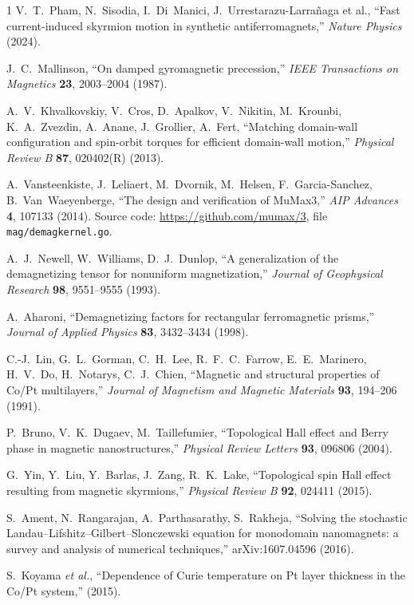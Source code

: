\documentclass[11pt,a4paper]{article}
\begin{document}
\begin{thebibliography}{1}
V.~T.~Pham, N.~Sisodia, I.~Di~Manici,
J.~Urrestarazu-Larra\~{n}aga et al.,
``Fast current-induced skyrmion motion in synthetic
antiferromagnets,''
\emph{Nature Physics} (2024).

J.~C.~Mallinson,
``On damped gyromagnetic precession,''
\emph{IEEE Transactions on Magnetics}
\textbf{23}, 2003--2004 (1987).

A.~V.~Khvalkovskiy, V.~Cros, D.~Apalkov, V.~Nikitin,
M.~Krounbi, K.~A.~Zvezdin, A.~Anane, J.~Grollier, A.~Fert,
``Matching domain-wall configuration and spin-orbit torques for
efficient domain-wall motion,''
\emph{Physical Review B} \textbf{87}, 020402(R) (2013).

A.~Vansteenkiste, J.~Leliaert, M.~Dvornik, M.~Helsen,
F.~Garcia-Sanchez, B.~Van~Waeyenberge,
``The design and verification of MuMax3,''
\emph{AIP Advances} \textbf{4}, 107133 (2014).
Source code: \url{https://github.com/mumax/3},
file \texttt{mag/demagkernel.go}.

A.~J.~Newell, W.~Williams, D.~J.~Dunlop,
``A generalization of the demagnetizing tensor for nonuniform
magnetization,''
\emph{Journal of Geophysical Research} \textbf{98}, 9551--9555 (1993).

A.~Aharoni,
``Demagnetizing factors for rectangular ferromagnetic prisms,''
\emph{Journal of Applied Physics} \textbf{83}, 3432--3434 (1998).

C.-J.~Lin, G.~L.~Gorman, C.~H.~Lee, R.~F.~C.~Farrow,
E.~E.~Marinero, H.~V.~Do, H.~Notarys, C.~J.~Chien,
``Magnetic and structural properties of Co/Pt multilayers,''
\emph{Journal of Magnetism and Magnetic Materials}
\textbf{93}, 194--206 (1991).

P.~Bruno, V.~K.~Dugaev, M.~Taillefumier,
``Topological Hall effect and Berry phase in magnetic
nanostructures,''
\emph{Physical Review Letters} \textbf{93}, 096806 (2004).

G.~Yin, Y.~Liu, Y.~Barlas, J.~Zang, R.~K.~Lake,
``Topological spin Hall effect resulting from magnetic
skyrmions,''
\emph{Physical Review B} \textbf{92}, 024411 (2015).

S.~Ament, N.~Rangarajan, A.~Parthasarathy, S.~Rakheja,
``Solving the stochastic Landau--Lifshitz--Gilbert--Slonczewski
equation for monodomain nanomagnets: a survey and analysis of
numerical techniques,'' arXiv:1607.04596 (2016).

S.~Koyama \emph{et al.},
``Dependence of Curie temperature on Pt layer thickness in the
Co/Pt system,'' (2015).
\end{thebibliography}
\end{document}

